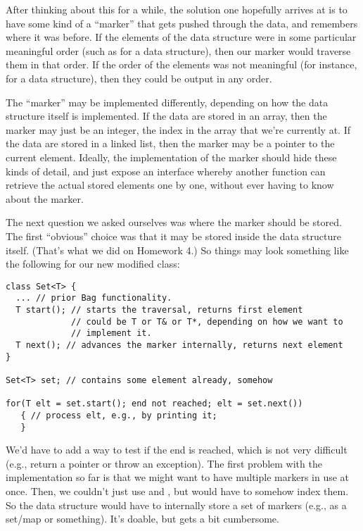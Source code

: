After thinking about this for a while, the solution one hopefully
arrives at is to have some kind of a ``marker''
that gets pushed through the data, and remembers where it was before.
If the elements of the data structure were in some particular
meaningful order (such as for a  data structure), then our
marker would traverse them in that order. 
If the order of the elements was not meaningful (for instance, for a
 data structure), then they could be output in any order.

The ``marker'' may be implemented differently, depending on how the
data structure itself is implemented. If the data are stored in an
array, then the marker may just be an integer, the index in the array
that we're currently at.
If the data are stored in a linked list, then the marker may be a
pointer to the current element.
Ideally, the implementation of the marker should hide these kinds of
detail, and just expose an interface whereby another function can
retrieve the actual stored elements one by one, without ever having to
know about the marker.

The next question we asked ourselves was where the marker should be
stored. The first ``obvious'' choice was that it may be stored inside
the data structure itself. (That's what we did on Homework 4.)
So things may look something like the
following for our new modified  class:

\begin{verbatim}
class Set<T> {
  ... // prior Bag functionality.
  T start(); // starts the traversal, returns first element
             // could be T or T& or T*, depending on how we want to
             // implement it.
  T next(); // advances the marker internally, returns next element
}

Set<T> set; // contains some element already, somehow

for(T elt = set.start(); end not reached; elt = set.next())
   { // process elt, e.g., by printing it; 
   }
\end{verbatim}

We'd have to add a way to test if the end is reached, which is not
very difficult (e.g., return a  pointer or throw an
exception). 
The first problem with the implementation so far is that we might want
to have multiple markers in use at once. 
Then, we couldn't just use  and , but would
have to somehow index them.
So the data structure would have to internally store a set of markers
(e.g., as a set/map or something). 
It's doable, but gets a bit cumbersome.

